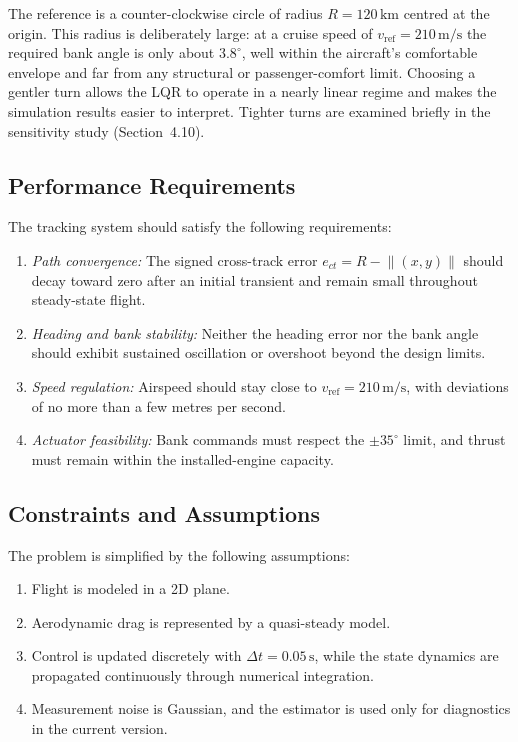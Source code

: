 \documentclass{Academic}
\begin{document}
The reference is a counter-clockwise circle of radius \(R=120\,\mathrm{km}\) centred at the origin. This radius is deliberately large: at a cruise speed of \(v_{\mathrm{ref}}=210\,\mathrm{m/s}\) the required bank angle is only about \(3.8^\circ\), well within the aircraft's comfortable envelope and far from any structural or passenger-comfort limit. Choosing a gentler turn allows the LQR to operate in a nearly linear regime and makes the simulation results easier to interpret. Tighter turns are examined briefly in the sensitivity study (Section~4.10).

\subsection{Performance Requirements}

The tracking system should satisfy the following requirements:
\begin{enumerate}
\item \emph{Path convergence:} The signed cross-track error \(e_{ct}=R-\lVert(x,y)\rVert\) should decay toward zero after an initial transient and remain small throughout steady-state flight.
\item \emph{Heading and bank stability:} Neither the heading error nor the bank angle should exhibit sustained oscillation or overshoot beyond the design limits.
\item \emph{Speed regulation:} Airspeed should stay close to \(v_{\mathrm{ref}}=210\,\mathrm{m/s}\), with deviations of no more than a few metres per second.
\item \emph{Actuator feasibility:} Bank commands must respect the \(\pm35^\circ\) limit, and thrust must remain within the installed-engine capacity.
\end{enumerate}

\subsection{Constraints and Assumptions}

The problem is simplified by the following assumptions:
\begin{enumerate}
\item Flight is modeled in a 2D plane.
\item Aerodynamic drag is represented by a quasi-steady model.
\item Control is updated discretely with \(\Delta t=0.05\,\mathrm{s}\), while the state dynamics are propagated continuously through numerical integration.
\item Measurement noise is Gaussian, and the estimator is used only for diagnostics in the current version.
\end{enumerate}
\end{document}
